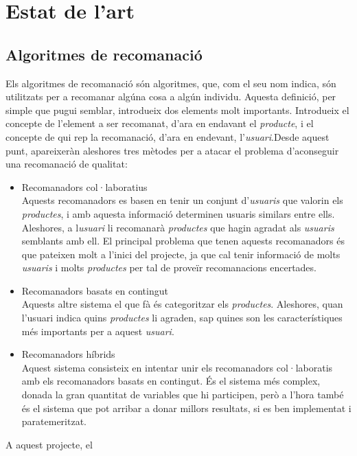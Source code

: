 \chapter{Estat de l'art}

\section{Algoritmes de recomanació}

Els algoritmes de recomanació són algoritmes, que, com el seu nom indica, són utilitzats per a recomanar algúna cosa a algún individu. Aquesta definició, per simple que pugui semblar, introdueix dos elements molt importants. Introdueix el concepte de l'element a ser recomanat, d'ara en endavant el \emph{producte}, i el concepte de qui rep la recomanació, d'ara en endevant, l'\emph{usuari}.Desde aquest punt, apareixeràn aleshores tres mètodes per a atacar el problema d'aconseguir una recomanació de qualitat:

\begin{itemize}
	\item Recomanadors col·laboratius \\
		Aquests recomanadors es basen en tenir un conjunt d'\emph{usuaris} que valorin els \emph{productes}, i amb aquesta informació determinen usuaris similars entre ells. Aleshores, a l\emph{usuari} li recomanarà \emph{productes} que hagin agradat als \emph{usuaris} semblants amb ell. El principal problema que tenen aquests recomanadors és que pateixen molt a l'inici del projecte, ja que cal tenir informació de molts \emph{usuaris} i molts \emph{productes} per tal de proveïr recomanacions encertades.
	\item Recomanadors basats en contingut \\
		Aquests altre sistema el que fà és categoritzar els \emph{productes}. Aleshores, quan l'usuari indica quins \emph{productes} li agraden, sap quines son les característiques més importants per a aquest \emph{usuari}.
	\item Recomanadors híbrids \\
		Aquest sistema consisteix en intentar unir els recomanadors col·laboratis amb els recomanadors basats en contingut. És el sistema més complex, donada la gran quantitat de variables que hi participen, però a l'hora també és el sistema que pot arribar a donar millors resultats, si es ben implementat i paratemeritzat.
\end{itemize}

A aquest projecte, el 

